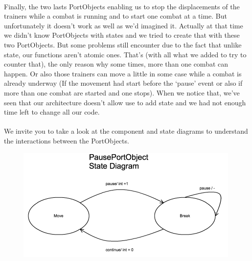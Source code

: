 \documentclass[a4paper,10pt]{article}
\begin{document}
\paragraph{}
Finally, the two lasts PortObjects enabling us to stop the displacements of the trainers while a combat is running and to start one combat at a time.  But unfortunately it doesn’t work as well as we’d imagined it. Actually at that time we didn’t know PortObjects with states and we tried to create that with these two PortObjects. But some problems still encounter due to the fact that unlike state, our functions aren’t atomic ones.  That’s (with all what we added to try to counter that), the only reason why some times, more than one combat can happen. Or also those trainers can move a little in some case while a combat is already underway (If the movement had start before the ‘pause’ event or also if more than one combat are started and one stops). When we notice that, we’ve seen that our architecture doesn’t allow use to add state and we had not enough time left to change all our code.
\paragraph{}
We invite you to take a look at the component and state diagrams to understand the interactions between the PortObjects.

      
\begin{figure}[h!]
      \begin{center}
      \includegraphics[scale=1]{State_diag_PPO.png}
      \end{center}
      \end{figure}
      
\end{document}
